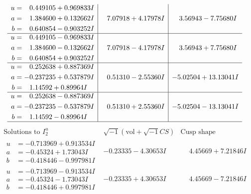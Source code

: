 \documentclass[1p]{elsarticle_modified}
\theoremstyle{definition}
\newcommand{\I}{\sqrt{-1}}
\begin{document}
$$\begin{array}{c|c|c}
\begin{aligned}
u &= \phantom{-}0.449105 + 0.969833 I \\
a &= \phantom{-}1.384600 + 0.132662 I \\
b &= \phantom{-}0.640854 - 0.903252 I\end{aligned}
 & \phantom{-}7.07918 + 4.17978 I & \phantom{-}3.56943 - 7.75680 I \\ \hline\begin{aligned}
u &= \phantom{-}0.449105 - 0.969833 I \\
a &= \phantom{-}1.384600 - 0.132662 I \\
b &= \phantom{-}0.640854 + 0.903252 I\end{aligned}
 & \phantom{-}7.07918 - 4.17978 I & \phantom{-}3.56943 + 7.75680 I \\ \hline\begin{aligned}
u &= \phantom{-}0.252638 + 0.887369 I \\
a &= -0.237235 + 0.537879 I \\
b &= \phantom{-}1.14592 + 0.89964 I\end{aligned}
 & \phantom{-}0.51310 - 2.55360 I & -5.02504 + 13.13041 I \\ \hline\begin{aligned}
u &= \phantom{-}0.252638 - 0.887369 I \\
a &= -0.237235 - 0.537879 I \\
b &= \phantom{-}1.14592 - 0.89964 I\end{aligned}
 & \phantom{-}0.51310 + 2.55360 I & -5.02504 - 13.13041 I\\
 \hline 
 \end{array}$$\newpage$$\begin{array}{c|c|c}  
\text{Solutions to }I^u_{2}& \I (\text{vol} + \sqrt{-1}CS) & \text{Cusp shape}\\
 \hline 
\begin{aligned}
u &= -0.713969 + 0.913534 I \\
a &= -0.45324 + 1.73043 I \\
b &= -0.418446 - 0.997981 I\end{aligned}
 & -0.23335 - 4.30653 I & \phantom{-}4.45669 + 7.21846 I \\ \hline\begin{aligned}
u &= -0.713969 - 0.913534 I \\
a &= -0.45324 - 1.73043 I \\
b &= -0.418446 + 0.997981 I\end{aligned}
 & -0.23335 + 4.30653 I & \phantom{-}4.45669 - 7.21846 I \\ \hline\begin{aligned}

\end{aligned}
\end{array}$$
\end{document}
